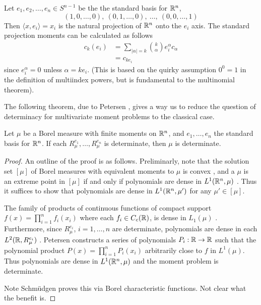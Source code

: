 \begin{myexample}
  Let $e_1, e_2, \ldots, e_n \in S^{n-1}$ be the the standard basis for $\mathbb{R}^n$,
  \[
    (1, 0, \ldots, 0),~ (0, 1, \ldots, 0),~ \ldots,~ (0,0, \ldots, 1)
  \]
  Then $\langle x, e_i \rangle = x_i$ is the natural projection of $\mathbb{R}^n$ onto the $e_i$ axis. The standard projection moments can be calculated as follows
  \begin{align*}
    c_k(e_i) 
    &= \sum_{|\alpha| = k} \binom{k}{\alpha} e_i^\alpha c_\alpha \\
    &= c_{ke_i}
  \end{align*}
  since $e_i^\alpha = 0$ unless $\alpha = ke_i$. (This is based on the quirky assumption $0^0 = 1$ in the definition of multiindex powers, but is fundamental to the multinomial theorem).
\end{myexample}

The following theorem, due to Petersen \cn, gives a way us to reduce the question of determinacy for multivariate moment problems to the classical case.

\begin{proposition}
  Let $\mu$ be a Borel measure with finite moments on $\mathbb{R}^n$, and $e_1, \ldots, e_n$ the standard basis for $\mathbb{R}^n$. If each $R_\mu^{e_1}, \ldots, R_\mu^{e_n}$ is determinate, then $\mu$ is determinate.
\end{proposition}

\begin{proof}
  An outline of the proof is as follows. Preliminarly, note that the solution set $[\mu]$ of Borel measures with equivalent moments to $\mu$ is convex \cn, and a $\mu$ is an extreme point in $[\mu]$ if and only if polynomials are dense in $L^1(\mathbb{R}^n, \mu)$ \cn. Thus it suffices to show that polynomials are dense in $L^1(\mathbb{R}^n, \mu')$ for any $\mu' \in [\mu]$.
  
  The family of products of continuous functions of compact support $f(x) = \prod_{i=1}^n f_i(x_i)$ where each $f_i \in C_c(\mathbb{R})$, is dense in $L_1(\mu)$ \cn. Furthermore, since $R_\mu^{e_i}$, $i = 1, \ldots, n$ are determinate, polynomials are dense in each $L^2(\mathbb{R}, R_\mu^{e_i})$ \cn. Petersen constructs a series of polynomials $P_i : \mathbb{R} \rightarrow \mathbb{R}$ such that the polynomial product $P(x) = \prod_{i = 1}^n P_i(x_i)$ arbitrarily close to $f$ in $L^1(\mu)$. Thus polynomials are dense in $L^1(\mathbb{R}^n, \mu)$ and the moment problem is determinate. \pn 
  
  Note Schm\"udgen proves this via Borel characteristic functions. Not clear what the benefit is.
\end{proof}

